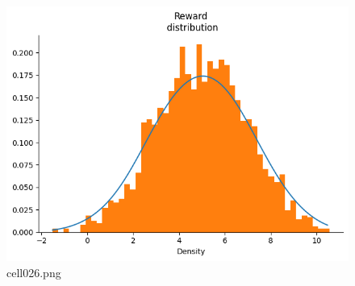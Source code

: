\begin{figure}[ht]
	\centering
	\includegraphics[scale=0.8, max width=\linewidth]{./fig/bayesian-brain/quantile-expectile-regression/cell026.png}
	\caption{cell026.png}
	\label{cell026.png}
\end{figure}